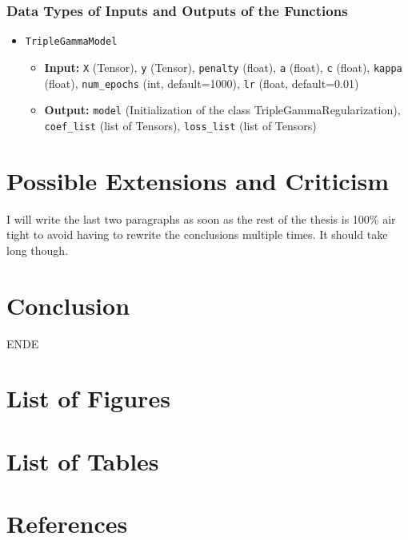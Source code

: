 \documentclass[12pt,a4paper]{article}
\newenvironment{lightbluebox}{%
    \begin{tcolorbox}[colback=lightblue, colframe=lightblue, fontupper=\itshape]%
}{%
    \end{tcolorbox}%
}
\begin{document}
\subsubsection*{Data Types of Inputs and Outputs of the Functions}
\begin{itemize}
  	\item \texttt{TripleGammaModel}
    \begin{itemize}
        \item \textbf{Input:} \texttt{X} (Tensor), \texttt{y} (Tensor), \texttt{penalty} (float), \texttt{a} (float), \texttt{c} (float), \texttt{kappa} (float), \texttt{num\_epochs} (int, default=1000), \texttt{lr} (float, default=0.01)
        \item \textbf{Output:} \texttt{model} (Initialization of the class TripleGammaRegularization), \texttt{coef\_list} (list of Tensors), \texttt{loss\_list} (list of Tensors)
    \end{itemize}
\end{itemize}

\section{Possible Extensions and Criticism}


\begin{lightbluebox}
I will write the last two paragraphs as soon as the rest of the thesis is 100\% air tight to avoid having to rewrite the conclusions multiple times. It should take long though.
\end{lightbluebox}
\section{Conclusion}
\begin{lightbluebox}
ENDE
\end{lightbluebox}
\newpage
\section{List of Figures}
\listoffigures

\newpage
\section{List of Tables}
\listoftables

\newpage
\section{References}

\setcounter{page}{\thesavepage}
\pagestyle{plain}
%
%
\printbibliography[]
\clearpage
\end{document}
